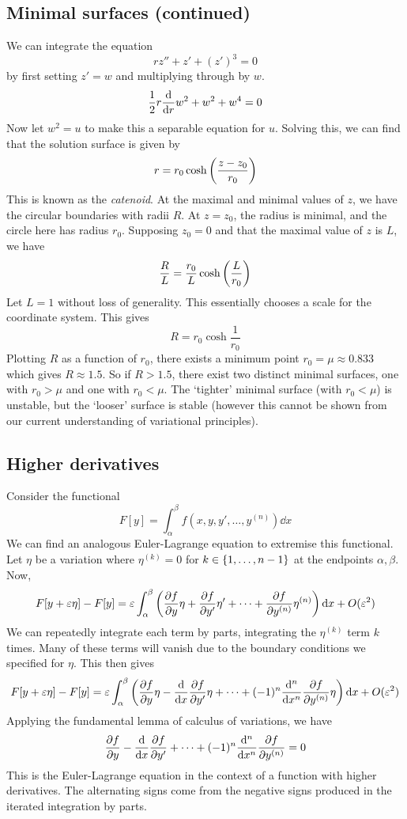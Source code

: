 \subsection{Minimal surfaces (continued)}
We can integrate the equation
\[
	rz'' + z' + (z')^3 = 0
\]
by first setting \( z' = w \) and multiplying through by \( w \).
\[
	\frac{1}{2}r\dv{r} w^2 + w^2 + w^4 = 0
\]
Now let \( w^2 = u \) to make this a separable equation for \( u \).
Solving this, we can find that the solution surface is given by
\[
	r = r_0 \cosh \qty(\frac{z-z_0}{r_0})
\]
This is known as the \textit{catenoid}.
At the maximal and minimal values of \( z \), we have the circular boundaries with radii \( R \).
At \( z = z_0 \), the radius is minimal, and the circle here has radius \( r_0 \).
Supposing \( z_0 = 0 \) and that the maximal value of \( z \) is \( L \), we have
\[
	\frac{R}{L} = \frac{r_0}{L} \cosh \qty(\frac{L}{r_0})
\]
Let \( L = 1 \) without loss of generality.
This essentially chooses a scale for the coordinate system.
This gives
\[
	R = r_0 \cosh \frac{1}{r_0}
\]
Plotting \( R \) as a function of \( r_0 \), there exists a minimum point \( r_0 = \mu \approx 0.833 \) which gives \( R \approx 1.5 \).
So if \( R > 1.5 \), there exist two distinct minimal surfaces, one with \( r_0 > \mu \) and one with \( r_0 < \mu \).
The `tighter' minimal surface (with \( r_0 < \mu \)) is unstable, but the `looser' surface is stable (however this cannot be shown from our current understanding of variational principles).

\subsection{Higher derivatives}
Consider the functional
\[
	F[y] = \int_\alpha^\beta f(x,y,y',\dots,y^{(n)}) \dd{x}
\]
We can find an analogous Euler-Lagrange equation to extremise this functional.
Let \( \eta \) be a variation where \( \eta^{(k)} = 0 \) for \( k \in \qty{1, \dots, n-1} \) at the endpoints \( \alpha, \beta \).
Now,
\[
	F[y+\varepsilon \eta] - F[y] = \varepsilon\int_\alpha^\beta \qty(\pdv{f}{y} \eta + \pdv{f}{y'}\eta' + \dots + \pdv{f}{y^{(n)}}\eta^{(n)}) \dd{x} + O(\varepsilon^2)
\]
We can repeatedly integrate each term by parts, integrating the \( \eta^{(k)} \) term \( k \) times.
Many of these terms will vanish due to the boundary conditions we specified for \( \eta \).
This then gives
\[
	F[y+\varepsilon \eta] - F[y] = \varepsilon\int_\alpha^\beta \qty(\pdv{f}{y} \eta - \dv{x} \pdv{f}{y'}\eta + \dots + (-1)^n \dv[n]{x} \pdv{f}{y^{(n)}}\eta) \dd{x} + O(\varepsilon^2)
\]
Applying the fundamental lemma of calculus of variations, we have
\[
	\pdv{f}{y} - \dv{x} \pdv{f}{y'} + \dots + (-1)^n \dv[n]{x} \pdv{f}{y^{(n)}} = 0
\]
This is the Euler-Lagrange equation in the context of a function with higher derivatives.
The alternating signs come from the negative signs produced in the iterated integration by parts.

